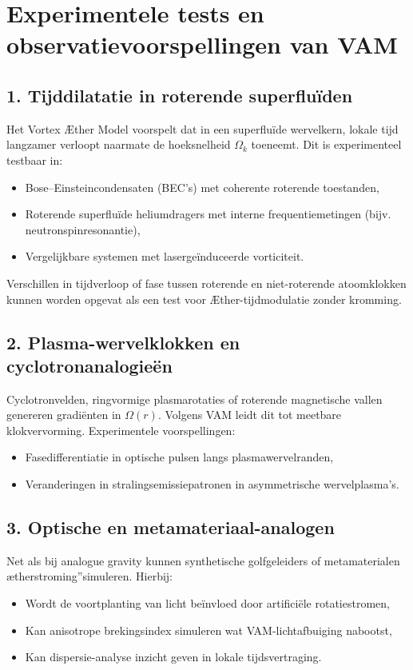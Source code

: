 \section{Experimentele tests en observatievoorspellingen van VAM}


\subsection{1. Tijddilatatie in roterende superfluïden}

Het Vortex Æther Model voorspelt dat in een superfluïde wervelkern, lokale tijd langzamer verloopt naarmate de hoeksnelheid $\Omega_k$ toeneemt. Dit is experimenteel testbaar in:
\begin{itemize}
    \item Bose–Einsteincondensaten (BEC's) met coherente roterende toestanden,
    \item Roterende superfluïde heliumdragers met interne frequentiemetingen (bijv. neutronspinresonantie),
    \item Vergelijkbare systemen met lasergeïnduceerde vorticiteit.
\end{itemize}

Verschillen in tijdverloop of fase tussen roterende en niet-roterende atoomklokken kunnen worden opgevat als een test voor Æther-tijdmodulatie zonder kromming.~\cite{Steinhauer2016}


\subsection{2. Plasma-wervelklokken en cyclotronanalogieën}

Cyclotronvelden, ringvormige plasmarotaties of roterende magnetische vallen genereren gradiënten in $\Omega(r)$. Volgens VAM leidt dit tot meetbare klokvervorming. Experimentele voorspellingen:
\begin{itemize}
    \item Fasedifferentiatie in optische pulsen langs plasmawervelranden,~\cite{Unruh1981}
    \item Veranderingen in stralingsemissiepatronen in asymmetrische wervelplasma's.
\end{itemize}

\subsection{3. Optische en metamateriaal-analogen}

Net als bij analogue gravity kunnen synthetische golfgeleiders of metamaterialen \grqq ætherstroming\textquotedblright simuleren. Hierbij:
\begin{itemize}
    \item Wordt de voortplanting van licht beïnvloed door artificiële rotatiestromen,
    \item Kan anisotrope brekingsindex simuleren wat VAM-lichtafbuiging nabootst,
    \item Kan dispersie-analyse inzicht geven in lokale tijdsvertraging.
\end{itemize}

